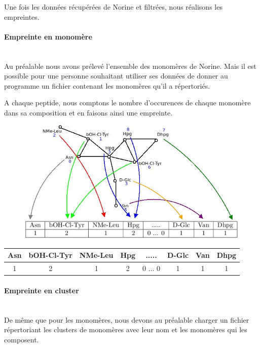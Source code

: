 \documentclass[a4paper,10pt]{report}
\begin{document}
	Une fois les données récupérées de Norine et filtrées, nous réalisons les empreintes.
	
	\paragraph{Empreinte en monomère}
	    ~\\
	    Au préalable nous avons prélevé l'ensemble des monomères de Norine. Mais il est possible pour une personne souhaitant utiliser ses données de donner au programme un fichier contenant les monomères qu'il a répertoriés.
	    
	    A chaque peptide, nous comptons le nombre d'occurences de chaque monomère dans sa composition et en faisons ainsi une empreinte.
	    
	   \begin{figure}[h]
	    \includegraphics[scale = 0.5]{image/vanco_monoB.jpeg}
	    \end{figure}
	
	  \begin{flushleft}
	  \begin{tabular}{|c|c|c|c|c|c|c|c|}\hline
	    Asn & bOH-Cl-Tyr & NMe-Leu & Hpg & ..... & D-Glc & Van & Dhpg  \\\hline
	    1 & 2 & 1 & 2 & 0 ... 0 & 1 & 1 & 1 \\\hline
	  \end{tabular}
	  \label{table00}
	 \end{flushleft}
	    
	\paragraph{Empreinte en cluster}
	~\\
	  De même que pour les monomères, nous devons au préalable charger un fichier répertoriant les clusters de monomères avec leur nom et les monomères qui les composent.
	  
\end{document}
